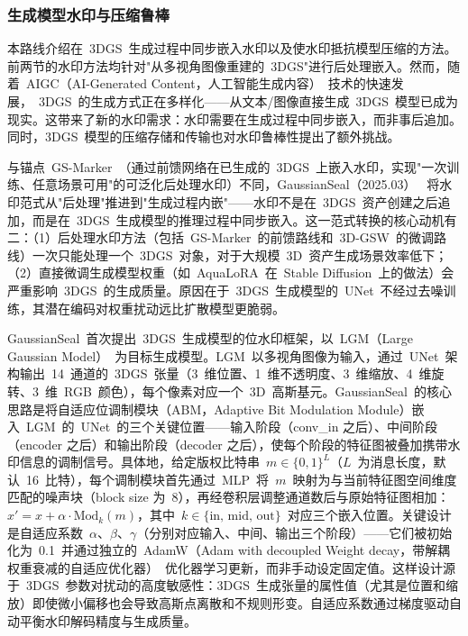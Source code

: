 \subsubsection{生成模型水印与压缩鲁棒}

本路线介绍在~3DGS~生成过程中同步嵌入水印以及使水印抵抗模型压缩的方法。前两节的水印方法均针对"从多视角图像重建的~3DGS"进行后处理嵌入。然而，随着~AIGC（AI-Generated Content，人工智能生成内容）~技术的快速发展，~3DGS~的生成方式正在多样化——从文本/图像直接生成~3DGS~模型已成为现实。这带来了新的水印需求：水印需要在生成过程中同步嵌入，而非事后追加。同时，3DGS~模型的压缩存储和传输也对水印鲁棒性提出了额外挑战。

与锚点~GS-Marker~（通过前馈网络在已生成的~3DGS~上嵌入水印，实现"一次训练、任意场景可用"的可泛化后处理水印）不同，GaussianSeal（2025.03）~\cite{2503_00531} 将水印范式从"后处理"推进到"生成过程内嵌"——水印不是在~3DGS~资产创建之后追加，而是在~3DGS~生成模型的推理过程中同步嵌入。这一范式转换的核心动机有二：（1）后处理水印方法（包括~GS-Marker~的前馈路线和~3D-GSW~的微调路线）一次只能处理一个~3DGS~对象，对于大规模~3D~资产生成场景效率低下；（2）直接微调生成模型权重（如~AquaLoRA~在~Stable Diffusion~上的做法）会严重影响~3DGS~的生成质量。原因在于~3DGS~生成模型的~UNet~不经过去噪训练，其潜在编码对权重扰动远比扩散模型更脆弱。

GaussianSeal~首次提出~3DGS~生成模型的位水印框架，以~LGM（Large Gaussian Model）~为目标生成模型。LGM~以多视角图像为输入，通过~UNet~架构输出~14~通道的~3DGS~张量（3~维位置、1~维不透明度、3~维缩放、4~维旋转、3~维~RGB~颜色），每个像素对应一个~3D~高斯基元。GaussianSeal~的核心思路是将自适应位调制模块（ABM，Adaptive Bit Modulation Module）嵌入~LGM~的~UNet~的三个关键位置——输入阶段（conv\_in 之后）、中间阶段（encoder 之后）和输出阶段（decoder 之后），使每个阶段的特征图被叠加携带水印信息的调制信号。具体地，给定版权比特串~$m \in \{0,1\}^L$（$L$~为消息长度，默认~16~比特），每个调制模块首先通过~MLP~将~$m$~映射为与当前特征图空间维度匹配的噪声块（block size 为~8），再经卷积层调整通道数后与原始特征图相加：$x' = x + \alpha \cdot \text{Mod}_k(m)$，其中~$k \in \{\text{in, mid, out}\}$~对应三个嵌入位置。关键设计是自适应系数~$\alpha$、$\beta$、$\gamma$（分别对应输入、中间、输出三个阶段）——它们被初始化为~0.1~并通过独立的~AdamW（Adam with decoupled Weight decay，带解耦权重衰减的自适应优化器）~优化器学习更新，而非手动设定固定值。这样设计源于~3DGS~参数对扰动的高度敏感性：3DGS~生成张量的属性值（尤其是位置和缩放）即使微小偏移也会导致高斯点离散和不规则形变。自适应系数通过梯度驱动自动平衡水印解码精度与生成质量。

